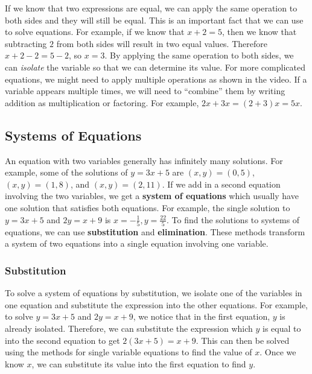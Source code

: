 \documentclass{article}
\begin{document}
    If we know that two expressions are equal, we can apply the same operation to both sides and they will still be equal.
    This is an important fact that we can use to solve equations.
    For example, if we know that $x + 2 = 5$, then we know that subtracting $2$ from both sides will result in two equal values.
    Therefore $x + 2 - 2 = 5 - 2$, so $x = 3$.
    By applying the same operation to both sides, we can \emph{isolate} the variable so that we can determine its value.
    For more complicated equations, we might need to apply multiple operations as shown in the video.
    If a variable appears multiple times, we will need to ``combine'' them by writing addition as multiplication or factoring.
    For example, $2x + 3x = (2 + 3)x = 5x$.
    \subsection*{Systems of Equations}
    An equation with two variables generally has infinitely many solutions.
    For example, some of the solutions of $y = 3x + 5$ are $(x, y) = (0, 5)$, $(x, y) = (1, 8)$, and $(x, y) = (2, 11)$.
    If we add in a second equation involving the two variables, we get a \textbf{system of equations} which usually have one solution that satisfies both equations.
    For example, the single solution to $y = 3x + 5$ and $2y = x + 9$ is $x = -\frac{1}{5}, y = \frac{22}{5}$.
    To find the solutions to systems of equations, we can use \textbf{substitution} and \textbf{elimination}.
    These methods transform a system of two equations into a single equation involving one variable.
    \subsubsection*{Substitution}
    To solve a system of equations by substitution, we isolate one of the variables in one equation and substitute the expression into the other equations.
    For example, to solve $y = 3x + 5$ and $2y = x + 9$, we notice that in the first equation, $y$ is already isolated.
    Therefore, we can substitute the expression which $y$ is equal to into the second equation to get $2(3x + 5) = x + 9$.
    This can then be solved using the methods for single variable equations to find the value of $x$.
    Once we know $x$, we can substitute its value into the first equation to find $y$.
\end{document}
